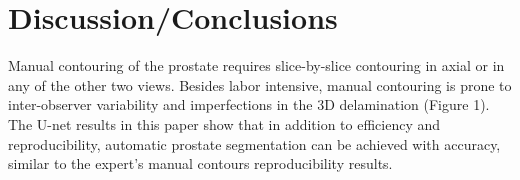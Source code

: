 \section{Discussion/Conclusions}
\label{sec:disc}
Manual contouring of the prostate requires slice-by-slice contouring 
in axial or in any of the other two views. Besides labor intensive, manual 
contouring is prone to inter-observer variability and imperfections 
in the 3D delamination (Figure 1). The U-net results in this paper show 
that in addition to efficiency and reproducibility, automatic prostate segmentation can be 
achieved with accuracy, similar to the expert’s manual contours reproducibility results. 
